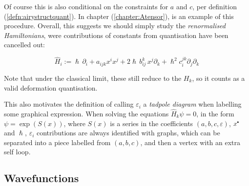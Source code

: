     Of course this is also conditional on the constraints for \(a\) and \(c\), per definition (\ref{defn:airystructquant}). In chapter (\ref{chapter:Atensor}), is an example of this procedure. Overall, this suggests we should simply study the \emph{renormalised Hamiltonians}, were contributions of constants from quantisation have been cancelled out:
    \begin{ex}
    \label{defn:renormalised}
    \[ \widehat{H}_i := \hslash\, \partial_i + a_{ijk} x^i x^j +   2 \hslash \,  b_{ij}^k  \, x^j \partial_k + \hslash^2 c_{i}^{jk} \partial_j \partial_k  \] 
    \end{ex}
    Note that under the classical limit, these still reduce to the \(H_k\), so it counts as a valid deformation quantisation.
    
    This also motivates the definition of calling \( \varepsilon_i\) a \emph{tadpole diagram} when labelling some graphical expression. When solving the equations \( \widehat{H}_k \psi = 0\), in the form  \(\psi = \exp(S(x))\), where \(S(x)\) is a series in the coefficients \( (a,b,c,\varepsilon)\), \(x^{\sbt}\) and \(\hslash\), \( \varepsilon_i\) contributions are always identified with graphs, which can be separated into a piece labelled from \((a,b,c)\), and then a vertex with an extra self loop. 
    

    
   
    

    

    \subsection{Wavefunctions}
    
